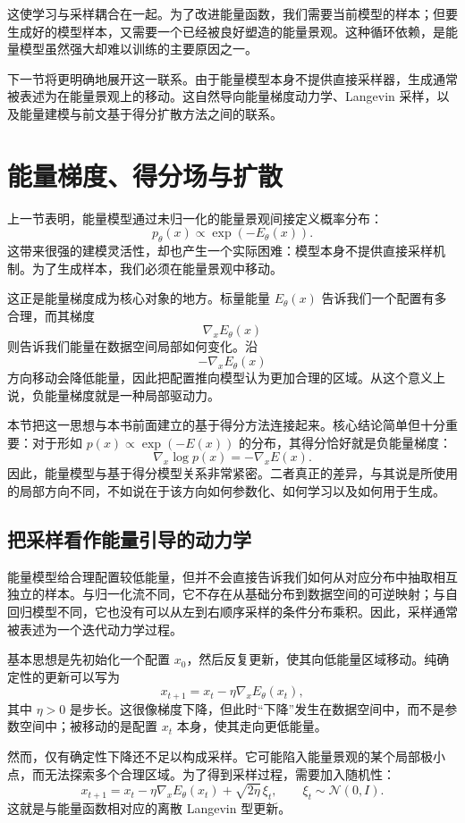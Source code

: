 这使学习与采样耦合在一起。为了改进能量函数，我们需要当前模型的样本；但要生成好的模型样本，又需要一个已经被良好塑造的能量景观。这种循环依赖，是能量模型虽然强大却难以训练的主要原因之一。

下一节将更明确地展开这一联系。由于能量模型本身不提供直接采样器，生成通常被表述为在能量景观上的移动。这自然导向能量梯度动力学、Langevin 采样，以及能量建模与前文基于得分扩散方法之间的联系。

\section{能量梯度、得分场与扩散}

上一节表明，能量模型通过未归一化的能量景观间接定义概率分布：
\[
p_\theta(x)
\propto
\exp(-E_\theta(x)).
\]
这带来很强的建模灵活性，却也产生一个实际困难：模型本身不提供直接采样机制。为了生成样本，我们必须在能量景观中移动。

这正是能量梯度成为核心对象的地方。标量能量 $E_\theta(x)$ 告诉我们一个配置有多合理，而其梯度
\[
\nabla_x E_\theta(x)
\]
则告诉我们能量在数据空间局部如何变化。沿
\[
-\nabla_x E_\theta(x)
\]
方向移动会降低能量，因此把配置推向模型认为更加合理的区域。从这个意义上说，负能量梯度就是一种局部驱动力。

本节把这一思想与本书前面建立的基于得分方法连接起来。核心结论简单但十分重要：对于形如 $p(x)\propto \exp(-E(x))$ 的分布，其得分恰好就是负能量梯度：
\[
\nabla_x\log p(x)
=
-\nabla_x E(x).
\]
因此，能量模型与基于得分模型关系非常紧密。二者真正的差异，与其说是所使用的局部方向不同，不如说在于该方向如何参数化、如何学习以及如何用于生成。

\subsection{把采样看作能量引导的动力学}

能量模型给合理配置较低能量，但并不会直接告诉我们如何从对应分布中抽取相互独立的样本。与归一化流不同，它不存在从基础分布到数据空间的可逆映射；与自回归模型不同，它也没有可以从左到右顺序采样的条件分布乘积。因此，采样通常被表述为一个迭代动力学过程。

基本思想是先初始化一个配置 $x_0$，然后反复更新，使其向低能量区域移动。纯确定性的更新可以写为
\[
x_{t+1}
=
x_t
-
\eta\nabla_x E_\theta(x_t),
\]
其中 $\eta>0$ 是步长。这很像梯度下降，但此时“下降”发生在数据空间中，而不是参数空间中；被移动的是配置 $x_t$ 本身，使其走向更低能量。

然而，仅有确定性下降还不足以构成采样。它可能陷入能量景观的某个局部极小点，而无法探索多个合理区域。为了得到采样过程，需要加入随机性：
\[
\boxed{
x_{t+1}
=
x_t
-
\eta \nabla_x E_\theta(x_t)
+
\sqrt{2\eta}\,\xi_t,
\qquad
\xi_t\sim\mathcal{N}(0,I).
}
\]
这就是与能量函数相对应的离散 Langevin 型更新。

